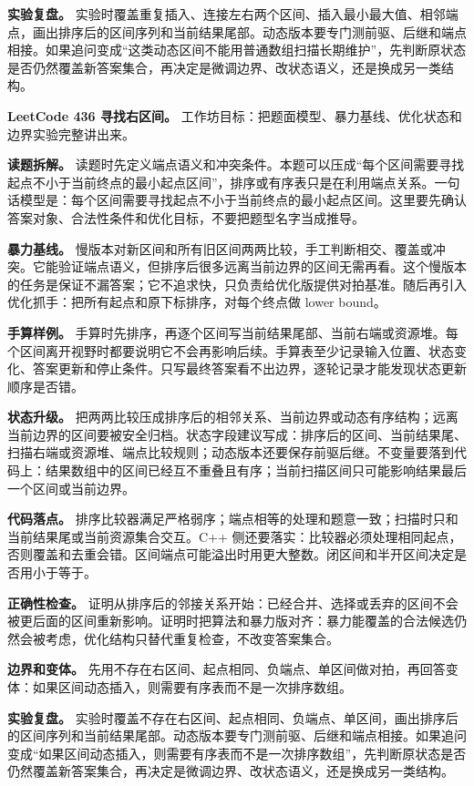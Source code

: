 \textbf{实验复盘。} 实验时覆盖重复插入、连接左右两个区间、插入最小最大值、相邻端点，画出排序后的区间序列和当前结果尾部。动态版本要专门测前驱、后继和端点相接。如果追问变成“这类动态区间不能用普通数组扫描长期维护”，先判断原状态是否仍然覆盖新答案集合，再决定是微调边界、改状态语义，还是换成另一类结构。

\noindent\textbf{LeetCode 436 寻找右区间。} 工作坊目标：把题面模型、暴力基线、优化状态和边界实验完整讲出来。

\textbf{读题拆解。} 读题时先定义端点语义和冲突条件。本题可以压成“每个区间需要寻找起点不小于当前终点的最小起点区间”，排序或有序表只是在利用端点关系。一句话模型是：每个区间需要寻找起点不小于当前终点的最小起点区间。这里要先确认答案对象、合法性条件和优化目标，不要把题型名字当成推导。

\textbf{暴力基线。} 慢版本对新区间和所有旧区间两两比较，手工判断相交、覆盖或冲突。它能验证端点语义，但排序后很多远离当前边界的区间无需再看。这个慢版本的任务是保证不漏答案；它不追求快，只负责给优化版提供对拍基准。随后再引入优化抓手：把所有起点和原下标排序，对每个终点做 lower bound。

\textbf{手算样例。} 手算时先排序，再逐个区间写当前结果尾部、当前右端或资源堆。每个区间离开视野时都要说明它不会再影响后续。手算表至少记录输入位置、状态变化、答案更新和停止条件。只写最终答案看不出边界，逐轮记录才能发现状态更新顺序是否错。

\textbf{状态升级。} 把两两比较压成排序后的相邻关系、当前边界或动态有序结构；远离当前边界的区间要被安全归档。状态字段建议写成：排序后的区间、当前结果尾、扫描右端或资源堆、端点比较规则；动态版本还要保存前驱后继。不变量要落到代码上：结果数组中的区间已经互不重叠且有序；当前扫描区间只可能影响结果最后一个区间或当前边界。

\textbf{代码落点。} 排序比较器满足严格弱序；端点相等的处理和题意一致；扫描时只和当前结果尾或当前资源集合交互。C++ 侧还要落实：比较器必须处理相同起点，否则覆盖和去重会错。区间端点可能溢出时用更大整数。闭区间和半开区间决定是否用小于等于。

\textbf{正确性检查。} 证明从排序后的邻接关系开始：已经合并、选择或丢弃的区间不会被更后面的区间重新影响。证明时把算法和暴力版对齐：暴力能覆盖的合法候选仍然会被考虑，优化结构只替代重复检查，不改变答案集合。

\textbf{边界和变体。} 先用不存在右区间、起点相同、负端点、单区间做对拍，再回答变体：如果区间动态插入，则需要有序表而不是一次排序数组。

\textbf{实验复盘。} 实验时覆盖不存在右区间、起点相同、负端点、单区间，画出排序后的区间序列和当前结果尾部。动态版本要专门测前驱、后继和端点相接。如果追问变成“如果区间动态插入，则需要有序表而不是一次排序数组”，先判断原状态是否仍然覆盖新答案集合，再决定是微调边界、改状态语义，还是换成另一类结构。

